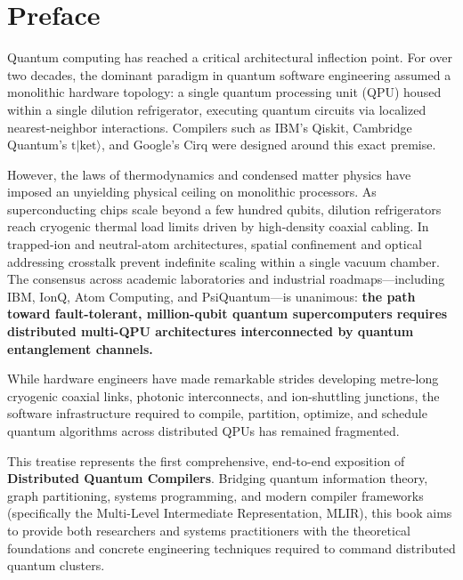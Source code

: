 \chapter*{Preface}

Quantum computing has reached a critical architectural inflection point. For over two decades, the dominant paradigm in quantum software engineering assumed a monolithic hardware topology: a single quantum processing unit (QPU) housed within a single dilution refrigerator, executing quantum circuits via localized nearest-neighbor interactions. Compilers such as IBM's Qiskit, Cambridge Quantum's $\text{t}|\text{ket}\rangle$, and Google's Cirq were designed around this exact premise.

However, the laws of thermodynamics and condensed matter physics have imposed an unyielding physical ceiling on monolithic processors. As superconducting chips scale beyond a few hundred qubits, dilution refrigerators reach cryogenic thermal load limits driven by high-density coaxial cabling. In trapped-ion and neutral-atom architectures, spatial confinement and optical addressing crosstalk prevent indefinite scaling within a single vacuum chamber. The consensus across academic laboratories and industrial roadmaps—including IBM, IonQ, Atom Computing, and PsiQuantum—is unanimous: \textbf{the path toward fault-tolerant, million-qubit quantum supercomputers requires distributed multi-QPU architectures interconnected by quantum entanglement channels.}

While hardware engineers have made remarkable strides developing metre-long cryogenic coaxial links, photonic interconnects, and ion-shuttling junctions, the software infrastructure required to compile, partition, optimize, and schedule quantum algorithms across distributed QPUs has remained fragmented. 

This treatise represents the first comprehensive, end-to-end exposition of \textbf{Distributed Quantum Compilers}. Bridging quantum information theory, graph partitioning, systems programming, and modern compiler frameworks (specifically the Multi-Level Intermediate Representation, MLIR), this book aims to provide both researchers and systems practitioners with the theoretical foundations and concrete engineering techniques required to command distributed quantum clusters.


